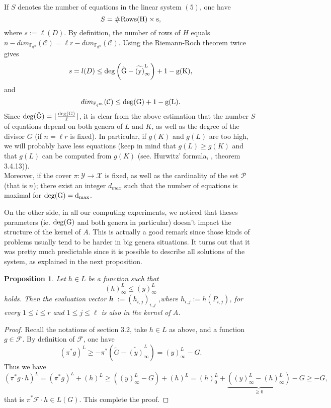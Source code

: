 \documentclass[10pt]{article}
\newtheorem{prop1}{Proposition}[]
\newcommand{\s}{\vspace{0.3cm}}
\newcommand{\cd}{\cdot}
\newcommand{\fqm}{\mathbb{F}_{q^m}}
\newcommand{\X}{\mathcal{X}}
\newcommand{\Y}{\mathcal{Y}}
\newcommand{\PR}{\mathcal{P}}
\begin{document}
\s 

If $S$ denotes the number of equations in the linear system $(5)$, one have 
\[S = \#\rm{Rows}(H) \times s,\]
where $s := \ell(D)$. By definition, the number of rows of $H$ equals $n-dim_{\fqm}(\mathcal{C})= \ell r - dim_{\fqm}(\mathcal{C})$. Using the Riemann-Roch theorem  twice gives 
\[s = l(D) \leq \rm{deg}\left(\tilde{G}-\widetilde{(y)}^L_{\infty}\right) +1 - g(K) ,\]
and
\[dim_{\fqm}(\mathcal{C}) \leq \rm{deg}(G)+1-g(L).\]
Since $\rm{deg}(\tilde{G}) = \lfloor \frac{\rm{deg}(G)}{\ell} \rfloor$, it is clear from the above estimation that the number $S$ of equations depend on both genera of $L$ and $K$, as well as the degree of the divisor $G$ (if $n=\ell r$ is fixed). In particular, if $g(K)$ and $g(L)$ are too high, we will probably have less equations (keep in mind that $g(L) \geq g(K)$ and that $g(L)$ can be computed from $g(K)$ (see. Hurwitz' formula, \cite{Sti}, theorem 3.4.13)). \\
Moreover, if the cover $\pi : \Y \rightarrow \X$ is fixed, as well as the cardinality of the set $\PR$ (that is $n$); there exist an integer $d_{max}$ such that the number of equations is maximal for $\rm{deg}(G)=d_{max}$. 

\s

On the other side, in all our computing experiments, we noticed that theses parameters (ie. $\rm{deg}(G)$ and both genera in particular) doesn't impact the structure of the kernel of $A$. This is actually a good remark since those kinds of problems usually tend to be harder in big genera situations. It turns out that it was pretty much predictable since it is possible to describe all solutions of the system, as explained in the next proposition. 

\s

\begin{prop1} \label{othersolutions}
Let $h \in L$ be a function such that 
\[ (h)^L_{\infty} \leq (y)^L_{\infty}\]
holds. Then the evaluation vector \textbf{h} $ := (h_{i,j})_{i,j}$ ,where $h_{i,j} := h(P_{i,j})$, for every $1 \leq i \leq r$ and $1 \leq j \leq \ell$ is also in the kernel of $A$.
\end{prop1}

\s

\begin{proof}
Recall the notations of section 3.2, take $h \in L$ as above, and a function $g \in \mathcal{F}$. By definition of $\mathcal{F}$, one have 
\[(\pi^*g)^L \geq -\pi^*\left(\tilde{G}-\widetilde{(y)}^L_{\infty}\right) = (y)^L_{\infty} - G.\]
Thus we have 
\[(\pi^*g \cd h)^L = (\pi^*g)^L  + (h)^L \geq  ((y)^L_{\infty} - G)+(h)^L = (h)^L_0 + \underbrace{((y)^L_{\infty}-(h)^L_{\infty})}_{\geq 0} - G \geq -G,\]
that is $\pi^*\mathcal{F}\cd h \in L(G)$. This complete the proof.

\end{proof}
\end{document}
